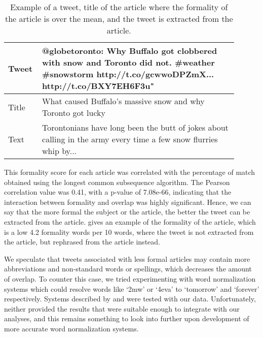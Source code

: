 \begin{table}[!htbp]
\centering
\begin{tabular}{|p{0.1\linewidth}|p{0.8\linewidth}|}
\hline
Tweet &  @globetoronto: Why Buffalo got clobbered with snow and Toronto did not. \#weather \#snowstorm http://t.co/gcwwoDPZmX... http://t.co/BXY7EH6F3u" \\ \hline
Title & What caused Buffalo’s massive snow and why Toronto got lucky \\  \hline
Text  & Torontonians have long been the butt of jokes about calling in the army every time a few snow flurries whip by... \\ \hline
\end{tabular}
\caption[Example of formality in article affecting tweet]{Example of a tweet, title of the article where the formality of the article is over the mean, and the tweet is extracted from the article.}
\label{tab:formalexample}
\end{table}

This formality score for each article was correlated with the percentage of match obtained using the longest common subsequence algorithm. The Pearson correlation value was 0.41, with a p-value of 7.08e-66, indicating that the interaction between formality and overlap was highly significant. Hence, we can say that the more formal the subject or the article, the better the tweet can be extracted from the article.  gives an example of the formality of the article, which is a low 4.2 formality words per 10 words, where the tweet is not extracted from the article, but rephrased from the article instead.

We speculate that tweets associated with less formal articles may contain more abbreviations and non-standard words or spellings, which decreases the amount of overlap. To counter this case, we tried experimenting with word normalization systems which could resolve words like `2mw' or `4eva' to `tomorrow' and `forever' respectively. Systems described by \cite{yang2013log} and \cite{gouws2011contextual} were tested with our data. Unfortunately, neither provided the results that were suitable enough to integrate with our analyses, and this remains something to look into further upon development of more accurate word normalization systems. 

